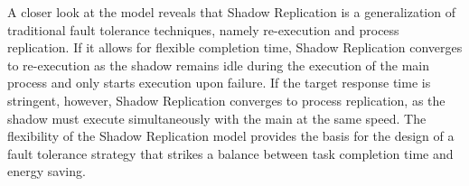 A closer look at the model reveals that Shadow
Replication is a generalization of traditional fault tolerance
techniques, namely re-execution and process replication. If it allows for flexible completion time, 
Shadow Replication converges to re-execution as
the shadow remains idle during the execution of the main process and
only starts execution upon failure. If the target response time is
stringent, however, Shadow Replication converges to process replication,
as the shadow must execute simultaneously with the main at the same
speed. The flexibility of the Shadow Replication model provides the
basis for the design of a fault tolerance strategy that strikes a
balance between task completion time and energy saving. 





